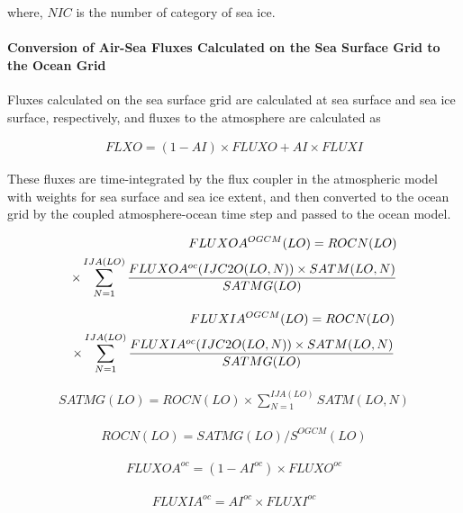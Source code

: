where, \(NIC\) is the number of category of sea ice.

\hypertarget{conversion-of-air-sea-fluxes-calculated-on-the-sea-surface-grid-to-the-ocean-grid}{%
\paragraph{Conversion of Air-Sea Fluxes Calculated on the Sea Surface Grid to the Ocean Grid}\label{conversion-of-air-sea-fluxes-calculated-on-the-sea-surface-grid-to-the-ocean-grid}}

Fluxes calculated on the sea surface grid are calculated at sea surface and sea ice surface, respectively, and fluxes to the atmosphere are calculated as

\begin{eqnarray} FLXO=(1-AI) \times FLUXO+AI \times FLUXI \end{eqnarray}

These fluxes are time-integrated by the flux coupler in the atmospheric model with weights for sea surface and sea ice extent, and then converted to the ocean grid by the coupled atmosphere-ocean time
step and passed to the ocean model.

\begin{eqnarray} FLUXOA^{OGCM}(LO) = ROCN(LO) \notag\\ \times \sum_{N=1}^{IJA(LO)} \frac{FLUXOA^{oc}(IJC2O(LO,N)) \times SATM(LO,N)}{SATMG(LO)} \end{eqnarray}

\begin{eqnarray} FLUXIA^{OGCM}(LO) = ROCN(LO) \notag\\ \times \sum_{N=1}^{IJA(LO)} \frac{FLUXIA^{oc}(IJC2O(LO,N)) \times SATM(LO,N)}{SATMG(LO)} \end{eqnarray}

\begin{eqnarray} SATMG(LO)=ROCN(LO) \times \sum_{N=1}^{IJA(LO)} SATM(LO,N) \end{eqnarray}

\begin{eqnarray} ROCN(LO)=SATMG(LO)/S^{OGCM}(LO) \end{eqnarray}

\begin{eqnarray} FLUXOA^{oc}=(1-AI^{oc}) \times FLUXO^{oc} \end{eqnarray}

\begin{eqnarray} FLUXIA^{oc}=AI^{oc} \times FLUXI^{oc} \end{eqnarray}

